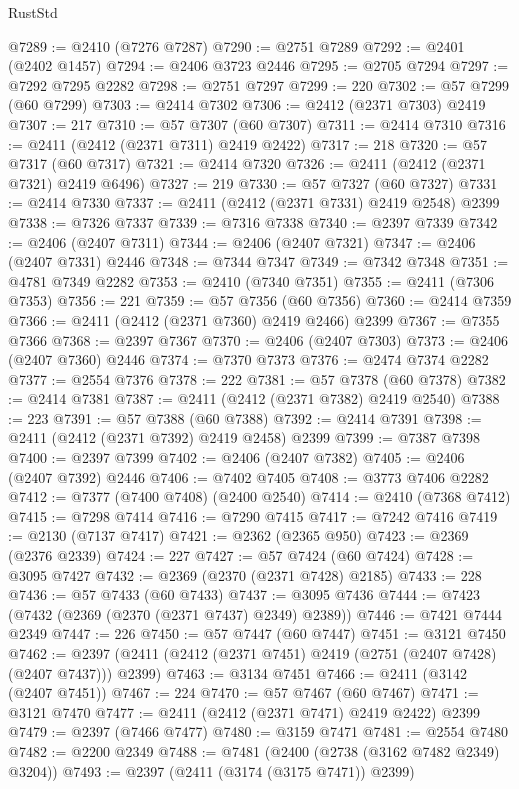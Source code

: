 \begin{lexlean}{RustStd}
\begin{coremodule}
@7289 := @2410 (@7276 @7287)
@7290 := @2751 @7289
@7292 := @2401 (@2402 @1457)
@7294 := @2406 @3723 @2446
@7295 := @2705 @7294
@7297 := @7292 @7295 @2282
@7298 := @2751 @7297
@7299 := 220
@7302 := @57 @7299 (@60 @7299)
@7303 := @2414 @7302
@7306 := @2412 (@2371 @7303) @2419
@7307 := 217
@7310 := @57 @7307 (@60 @7307)
@7311 := @2414 @7310
@7316 := @2411 (@2412 (@2371 @7311) @2419 @2422)
@7317 := 218
@7320 := @57 @7317 (@60 @7317)
@7321 := @2414 @7320
@7326 := @2411 (@2412 (@2371 @7321) @2419 @6496)
@7327 := 219
@7330 := @57 @7327 (@60 @7327)
@7331 := @2414 @7330
@7337 := @2411 (@2412 (@2371 @7331) @2419 @2548) @2399
@7338 := @7326 @7337
@7339 := @7316 @7338
@7340 := @2397 @7339
@7342 := @2406 (@2407 @7311)
@7344 := @2406 (@2407 @7321)
@7347 := @2406 (@2407 @7331) @2446
@7348 := @7344 @7347
@7349 := @7342 @7348
@7351 := @4781 @7349 @2282
@7353 := @2410 (@7340 @7351)
@7355 := @2411 (@7306 @7353)
@7356 := 221
@7359 := @57 @7356 (@60 @7356)
@7360 := @2414 @7359
@7366 := @2411 (@2412 (@2371 @7360) @2419 @2466) @2399
@7367 := @7355 @7366
@7368 := @2397 @7367
@7370 := @2406 (@2407 @7303)
@7373 := @2406 (@2407 @7360) @2446
@7374 := @7370 @7373
@7376 := @2474 @7374 @2282
@7377 := @2554 @7376
@7378 := 222
@7381 := @57 @7378 (@60 @7378)
@7382 := @2414 @7381
@7387 := @2411 (@2412 (@2371 @7382) @2419 @2540)
@7388 := 223
@7391 := @57 @7388 (@60 @7388)
@7392 := @2414 @7391
@7398 := @2411 (@2412 (@2371 @7392) @2419 @2458) @2399
@7399 := @7387 @7398
@7400 := @2397 @7399
@7402 := @2406 (@2407 @7382)
@7405 := @2406 (@2407 @7392) @2446
@7406 := @7402 @7405
@7408 := @3773 @7406 @2282
@7412 := @7377 (@7400 @7408) (@2400 @2540)
@7414 := @2410 (@7368 @7412)
@7415 := @7298 @7414
@7416 := @7290 @7415
@7417 := @7242 @7416
@7419 := @2130 (@7137 @7417)
@7421 := @2362 (@2365 @950)
@7423 := @2369 (@2376 @2339)
@7424 := 227
@7427 := @57 @7424 (@60 @7424)
@7428 := @3095 @7427
@7432 := @2369 (@2370 (@2371 @7428) @2185)
@7433 := 228
@7436 := @57 @7433 (@60 @7433)
@7437 := @3095 @7436
@7444 := @7423 (@7432 (@2369 (@2370 (@2371 @7437) @2349) @2389))
@7446 := @7421 @7444 @2349
@7447 := 226
@7450 := @57 @7447 (@60 @7447)
@7451 := @3121 @7450
@7462 := @2397 (@2411 (@2412 (@2371 @7451) @2419 (@2751 (@2407 @7428) (@2407 @7437))) @2399)
@7463 := @3134 @7451
@7466 := @2411 (@3142 (@2407 @7451))
@7467 := 224
@7470 := @57 @7467 (@60 @7467)
@7471 := @3121 @7470
@7477 := @2411 (@2412 (@2371 @7471) @2419 @2422) @2399
@7479 := @2397 (@7466 @7477)
@7480 := @3159 @7471
@7481 := @2554 @7480
@7482 := @2200 @2349
@7488 := @7481 (@2400 (@2738 (@3162 @7482 @2349) @3204))
@7493 := @2397 (@2411 (@3174 (@3175 @7471)) @2399)

\end{coremodule}
\end{lexlean}
